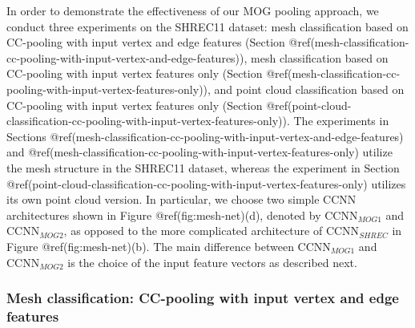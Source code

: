 \documentclass[
  12pt,
]{krantz}
\begin{document}
In order to demonstrate the effectiveness of our MOG pooling approach,
we conduct three experiments on the SHREC11 dataset: mesh classification
based on CC-pooling with input vertex and edge features (Section
@ref(mesh-classification-cc-pooling-with-input-vertex-and-edge-features)),
mesh classification based on CC-pooling with input vertex features only
(Section
@ref(mesh-classification-cc-pooling-with-input-vertex-features-only)),
and point cloud classification based on CC-pooling with input vertex
features only (Section
@ref(point-cloud-classification-cc-pooling-with-input-vertex-features-only)).
The experiments in Sections
@ref(mesh-classification-cc-pooling-with-input-vertex-and-edge-features)
and @ref(mesh-classification-cc-pooling-with-input-vertex-features-only)
utilize the mesh structure in the SHREC11 dataset, whereas the
experiment in Section
@ref(point-cloud-classification-cc-pooling-with-input-vertex-features-only)
utilizes its own point cloud version. In particular, we choose two
simple CCNN architectures shown in Figure @ref(fig:mesh-net)(d), denoted
by \(\mbox{CCNN}_{MOG1}\) and \(\mbox{CCNN}_{MOG2}\), as opposed to the
more complicated architecture of \(\mbox{CCNN}_{SHREC}\) in Figure
@ref(fig:mesh-net)(b). The main difference between
\(\mbox{CCNN}_{MOG1}\) and \(\mbox{CCNN}_{MOG2}\) is the choice of the
input feature vectors as described next.

\subsubsection{Mesh classification: CC-pooling with input vertex and
edge
features}\label{mesh-classification-cc-pooling-with-input-vertex-and-edge-features}
\end{document}
